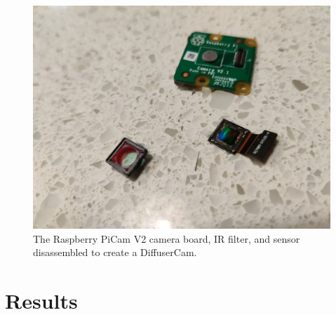 \documentclass[final]{cvpr}
\begin{document}
\begin{figure}[t]
	\centering
	\includegraphics[width=1.0\linewidth]{images/board-filter-sensor}
	\caption{\label{fig:board-filter-sensor}
		The Raspberry PiCam V2 camera board, IR filter, and sensor disassembled to create a DiffuserCam.}
\end{figure}



\section{Results}
\end{document}
